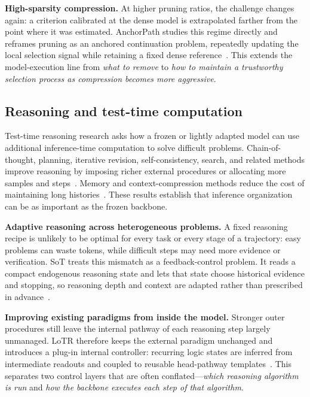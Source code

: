 \documentclass[12pt,a4paper]{article}
\newcommand{\method}[1]{{\sffamily\bfseries\color{MethodBlue}#1}}
\newcommand{\XDB}{\method{XDomainBench}}
\newcommand{\SubspacePath}{\method{SubspacePath Pruner}}
\newcommand{\AnchorPath}{\method{AnchorPath}}
\newcommand{\SoT}{\method{SoT}}
\newcommand{\LoTR}{\method{LoTR}}
\newcommand{\EtoE}{\method{E2E-Merge}}
\def\method#1{#1}\def\XDB{XDomainBench}\def\SubspacePath{SubspacePath Pruner}%
\def\SoT{SoT}\def\LoTR{LoTR}\def\EtoE{E2E-Merge}%
\begin{document}
\textbf{High-sparsity compression.} At higher pruning ratios, the challenge changes again: a criterion calibrated at the dense model is extrapolated farther from the point where it was estimated. \AnchorPath{} studies this regime directly and reframes pruning as an anchored continuation problem, repeatedly updating the local selection signal while retaining a fixed dense reference~\citep{gong2026anchorpath}. This extends the model-execution line from \emph{what to remove} to \emph{how to maintain a trustworthy selection process as compression becomes more aggressive}.

\subsection{Reasoning and test-time computation}
Test-time reasoning research asks how a frozen or lightly adapted model can use additional inference-time computation to solve difficult problems. Chain-of-thought, planning, iterative revision, self-consistency, search, and related methods improve reasoning by imposing richer external procedures or allocating more samples and steps~\citep{wei2022chain,wang2023plan,madaan2023self,wang2023selfconsistency,yao2023tree,snell2025scaling,brown2024large}. Memory and context-compression methods reduce the cost of maintaining long histories~\citep{li2023compressing,jiang2024longllmlingua}. These results establish that inference organization can be as important as the frozen backbone.

\textbf{Adaptive reasoning across heterogeneous problems.} A fixed reasoning recipe is unlikely to be optimal for every task or every stage of a trajectory: easy problems can waste tokens, while difficult steps may need more evidence or verification. \SoT{} treats this mismatch as a feedback-control problem. It reads a compact endogenous reasoning state and lets that state choose historical evidence and stopping, so reasoning depth and context are adapted rather than prescribed in advance~\citep{gong2026sot}.

\textbf{Improving existing paradigms from inside the model.} Stronger outer procedures still leave the internal pathway of each reasoning step largely unmanaged. \LoTR{} therefore keeps the external paradigm unchanged and introduces a plug-in internal controller: recurring logic states are inferred from intermediate readouts and coupled to reusable head-pathway templates~\citep{gong2026lotr}. This separates two control layers that are often conflated---\emph{which reasoning algorithm is run} and \emph{how the backbone executes each step of that algorithm}.
\end{document}
